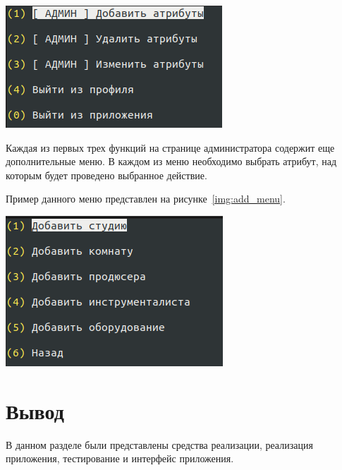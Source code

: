 \begin{center}
	\centering
	\includegraphics[height=0.2\textheight]{inc/img/main_admin.png}
	\label{img:main_admin}
\end{center}

Каждая из первых трех функций на странице администратора содержит еще дополнительные меню.
В каждом из меню необходимо выбрать атрибут, над которым будет проведено выбранное действие.

Пример данного меню представлен на рисунке~\ref{img:add_menu}.

\begin{center}
	\centering
	\includegraphics[height=0.23\textheight]{inc/img/add_menu.png}
	\label{img:add_menu}
\end{center}

\section*{Вывод}
В данном разделе были представлены средства реализации, реализация приложения, тестирование и интерфейс приложения.
